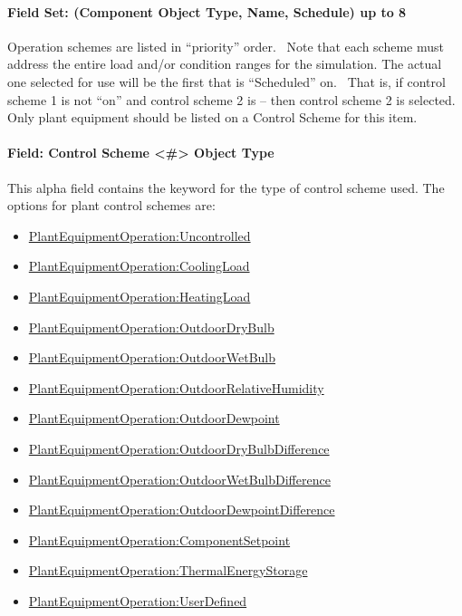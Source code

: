 \paragraph{Field Set: (Component Object Type, Name, Schedule) up to 8}\label{field-set-component-object-type-name-schedule-up-to-8}

Operation schemes are listed in ``priority'' order.~ Note that each scheme must address the entire load and/or condition ranges for the simulation. The actual one selected for use will be the first that is ``Scheduled'' on.~ That is, if control scheme 1 is not ``on'' and control scheme 2 is -- then control scheme 2 is selected. Only plant equipment should be listed on a Control Scheme for this item.

\paragraph{Field: Control Scheme \textless{}\#\textgreater{} Object Type}\label{field-control-scheme-object-type}

This alpha field contains the keyword for the type of control scheme used. The options for plant control schemes are:

\begin{itemize}
\item
  \hyperref[plantequipmentoperationuncontrolled]{PlantEquipmentOperation:Uncontrolled}
\item
  \hyperref[plantequipmentoperationcoolingload]{PlantEquipmentOperation:CoolingLoad}
\item
  \hyperref[plantequipmentoperationheatingload]{PlantEquipmentOperation:HeatingLoad}
\item
  \hyperref[plantequipmentoperationoutdoordrybulb]{PlantEquipmentOperation:OutdoorDryBulb}
\item
  \hyperref[plantequipmentoperationoutdoorwetbulb]{PlantEquipmentOperation:OutdoorWetBulb}
\item
  \hyperref[plantequipmentoperationoutdoorrelativehumidity]{PlantEquipmentOperation:OutdoorRelativeHumidity}
\item
  \hyperref[plantequipmentoperationoutdoordewpoint]{PlantEquipmentOperation:OutdoorDewpoint}
\item
  \hyperref[plantequipmentoperationoutdoordrybulbdifference]{PlantEquipmentOperation:OutdoorDryBulbDifference}
\item
  \hyperref[plantequipmentoperationoutdoorwetbulbdifference]{PlantEquipmentOperation:OutdoorWetBulbDifference}
\item
  \hyperref[plantequipmentoperationoutdoordewpointdifference]{PlantEquipmentOperation:OutdoorDewpointDifference}
\item
  \hyperref[plantequipmentoperationcomponentsetpoint]{PlantEquipmentOperation:ComponentSetpoint}
\item
  \hyperref[plantequipmentoperationthermalenergystorage]{PlantEquipmentOperation:ThermalEnergyStorage}
\item
  \hyperref[plantequipmentoperationuserdefined]{PlantEquipmentOperation:UserDefined}
\end{itemize}

